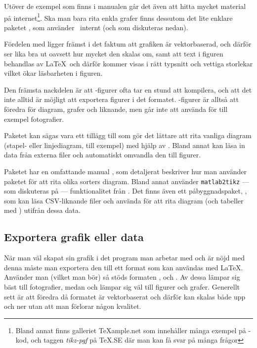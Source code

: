 \documentclass[10pt,../../a4.tex]{subfiles}
\begin{document}
Utöver de exempel som finns i manualen går det även att hitta mycket
material på internet\footnote{Bland annat finns galleriet
\TeX{}ample.net som innehåller 
många exempel på \PGFTikZ-kod, och taggen \emph{\mbox{tikz-pgf}} på
\TeX.SE
där man kan få svar på många frågor}. Ska man bara rita enkla grafer
finns dessutom det lite enklare paketet , som använder
\PGFTikZ\ internt (och som diskuteras nedan).%
%

Fördelen med \PGFTikZ ligger främst i det faktum att grafiken är
vektorbaserad, och därför ser lika bra ut oavsett hur mycket den skalas
om, samt att text i figuren behandlas av \LaTeX\ och därför kommer visas
i rätt typsnitt och vettiga storlekar vilket ökar läsbarheten i figuren.

Den främsta nackdelen är att \PGFTikZ-figurer ofta tar en stund att
kompilera, och att det inte alltid är möjligt att exportera figurer
i det formatet. \PGFTikZ-figurer är alltså att föredra för diagram,
grafer och liknande, men går inte att använda för till exempel
fotografier.

Paketet  kan sägas vara ett tillägg till \PGFTikZ som gör
det lättare att rita vanliga diagram (stapel- eller linjediagram, till
exempel) med hjälp av \PGFTikZ. Bland annat kan  läsa in
data från externa filer och automatiskt omvandla den till figurer.

Paketet har en omfattande manual \parencite{Feuersanger13a}, som
detaljerat beskriver hur man använder paketet för att rita olika
sorters diagram.
Bland annat använder \texttt{matlab2tikz} — som diskuteras på
 — funktionalitet från .
Det finns även ett påbyggnadspaket, 
\parencite{Feuersanger13b}, som kan läsa
CSV-liknande filer och använda  för att rita diagram
(och tabeller med ) utifrån dessa data.

\subsection{Exportera grafik eller data}
När man väl skapat sin grafik i det program man arbetar med och är nöjd
med denna måste man exportera den till ett format som kan användas med
\LaTeX. Använder man \pdfLaTeX (vilket man bör) så stöds formaten \JPEG,
\PNG och \PDF. Av dessa lämpar sig \JPEG bäst till fotografier, medan
\PNG och \PDF lämpar sig väl till figurer och grafer.
Generellt sett är \PDF att föredra då formatet är vektorbaserat och
därför kan skalas både upp och ner utan att man förlorar någon kvalitet.
\end{document}
